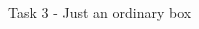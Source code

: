 \begin{frame}{Task 3 - Just an ordinary box}
\begin{columns}
\begin{column}{0.5\textwidth}
\begin{figure}[h]
{                    
                }
            \end{figure}
        \end{column}
    \end{columns}
\end{frame}